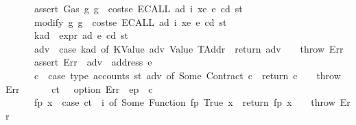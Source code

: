 \begin{isabellebody}
\ \ \ \ \ \ assert\ Gas\ {\isacharparenleft}{\kern0pt}{\isasymlambda}g{\isachardot}{\kern0pt}\ g\ {\isachargreater}{\kern0pt}\ costs\isactrlsub e\ {\isacharparenleft}{\kern0pt}ECALL\ ad\ i\ xe{\isacharparenright}{\kern0pt}\ e\ cd\ st{\isacharparenright}{\kern0pt}{\isacharsemicolon}{\kern0pt}\isanewline
\ \ \ \ \ \ modify\ {\isacharparenleft}{\kern0pt}{\isasymlambda}g{\isachardot}{\kern0pt}\ g\ {\isacharminus}{\kern0pt}\ costs\isactrlsub e\ {\isacharparenleft}{\kern0pt}ECALL\ ad\ i\ xe{\isacharparenright}{\kern0pt}\ e\ cd\ st{\isacharparenright}{\kern0pt}{\isacharsemicolon}{\kern0pt}\isanewline
\ \ \ \ \ \ kad\ {\isasymleftarrow}\ expr\ ad\ e\ cd\ st{\isacharsemicolon}{\kern0pt}\isanewline
\ \ \ \ \ \ adv\ {\isasymleftarrow}\ case\ kad\ of\ {\isacharparenleft}{\kern0pt}KValue\ adv{\isacharcomma}{\kern0pt}\ Value\ TAddr{\isacharparenright}{\kern0pt}\ {\isasymRightarrow}\ return\ adv\ {\isacharbar}{\kern0pt}\ {\isacharunderscore}{\kern0pt}\ {\isasymRightarrow}\ throw\ Err{\isacharsemicolon}{\kern0pt}\isanewline
\ \ \ \ \ \ assert\ Err\ {\isacharparenleft}{\kern0pt}{\isasymlambda}{\isacharunderscore}{\kern0pt}{\isachardot}{\kern0pt}\ adv\ {\isasymnoteq}\ address\ e{\isacharparenright}{\kern0pt}{\isacharsemicolon}{\kern0pt}\isanewline
\ \ \ \ \ \ c\ {\isasymleftarrow}\ case\ type\ {\isacharparenleft}{\kern0pt}accounts\ st\ adv{\isacharparenright}{\kern0pt}\ of\ Some\ {\isacharparenleft}{\kern0pt}Contract\ c{\isacharparenright}{\kern0pt}\ {\isasymRightarrow}\ return\ c\ {\isacharbar}{\kern0pt}\ {\isacharunderscore}{\kern0pt}\ {\isasymRightarrow}\ throw\ Err{\isacharsemicolon}{\kern0pt}\isanewline
\ \ \ \ \ \ {\isacharparenleft}{\kern0pt}ct{\isacharcomma}{\kern0pt}\ {\isacharunderscore}{\kern0pt}{\isacharparenright}{\kern0pt}\ {\isasymleftarrow}\ option\ Err\ {\isacharparenleft}{\kern0pt}{\isasymlambda}{\isacharunderscore}{\kern0pt}{\isachardot}{\kern0pt}\ ep\ {\isachardollar}{\kern0pt}{\isachardollar}{\kern0pt}\ c{\isacharparenright}{\kern0pt}{\isacharsemicolon}{\kern0pt}\isanewline
\ \ \ \ \ \ {\isacharparenleft}{\kern0pt}fp{\isacharcomma}{\kern0pt}\ x{\isacharparenright}{\kern0pt}\ {\isasymleftarrow}\ case\ ct\ {\isachardollar}{\kern0pt}{\isachardollar}{\kern0pt}\ i\ of\ Some\ {\isacharparenleft}{\kern0pt}Function\ {\isacharparenleft}{\kern0pt}fp{\isacharcomma}{\kern0pt}\ True{\isacharcomma}{\kern0pt}\ x{\isacharparenright}{\kern0pt}{\isacharparenright}{\kern0pt}\ {\isasymRightarrow}\ return\ {\isacharparenleft}{\kern0pt}fp{\isacharcomma}{\kern0pt}\ x{\isacharparenright}{\kern0pt}\ {\isacharbar}{\kern0pt}\ {\isacharunderscore}{\kern0pt}\ {\isasymRightarrow}\ throw\ Err{\isacharsemicolon}{\kern0pt}\isanewline

\end{isabellebody}
